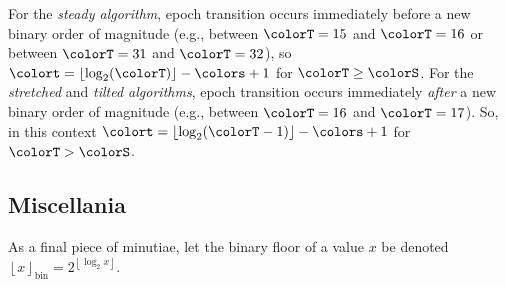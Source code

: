 For the \textit{steady algorithm}, epoch transition occurs immediately before a new binary order of magnitude (e.g., between $\colorT = 15$ and $\colorT = 16$ or between $\colorT = 31$ and $\colorT = 32$), so $\colort = \left\lfloor \log_2(\colorT) \right\rfloor - \colors + 1$ for $\colorT \geq \colorS$.
For the \textit{stretched} and \textit{tilted algorithms}, epoch transition occurs immediately \textit{after} a new binary order of magnitude (e.g., between $\colorT = 16$ and $\colorT = 17$).
So, in this context $\colort = \left\lfloor \log_2(\colorT - 1) \right\rfloor - \colors + 1$ for $\colorT > \colorS$.

\subsection{Miscellania}

As a final piece of minutiae, let the binary floor of a value $x$ be denoted $\left\lfloor x \right\rfloor_\mathrm{bin} = 2^{\left\lfloor \log_2 x \right\rfloor}$.
